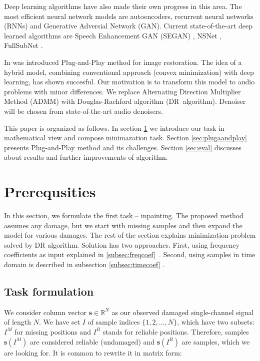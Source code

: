 \documentclass[conference]{IEEEtran}
\begin{document}
Deep learning algorithms have also made their own progress in this area.
The most efficient neural network models are autoencoders,
recurrent neural networks (RNNs) and
Generative Adversial Network (GAN).
Current state-of-the-art deep learned algorithms are Speech Enhancement GAN (SEGAN) \cite{Pascual2017}, NSNet \cite{Xia2020}, FullSubNet \cite{Hao2021}. 

In \cite{Chan2016} was introduced Plug-and-Play method for image restoration.
The idea of a hybrid model,
combining conventional approach (convex minimization) with deep learning,
has shown succesful.
Our motivation is to transform this model to audio problems with minor differences.
We replace Alternating Direction Multiplier Method (ADMM) with Douglas-Rachford algorithm (DR~algorithm).
Denoiser will be chosen from state-of-the-art audio denoisers. 

This paper is organized as follows. In section \ref{sec:prereq} we introduce our task in mathematical view and compose minimazation task.
Section \ref{sec:plugaandplay}  presents Plug-and-Play method and its challenges.
Section \ref{sec:eval} discusses about results and further improvements of algorithm.

\section{Prerequsities}\label{sec:prereq} 

In this section, we formulate the first task -- inpainting.
The proposed method \cite{Chan2016} assumes any damage,
but we start with missing samples and then expand the model for various damages.
The rest of the section explains minimization problem solved by DR algorithm.
Solution has two approaches.
First, using frequency coefficients as input explained in \ref{subsec:freqcoef}~\cite{Mokry2020}.
Second, using samples in time domain is described in subsection \ref{subsec:timecoef} \cite{Mokry2021}.


\subsection{Task formulation}

We consider column vector $ \mathbf{s} \in \mathbb{R}^{N} $ as our observed damaged single-channel signal of length $ N $.
We have set $ I $ of sample indices $ \{1,2,\dots,N\} $, which have two subsets: $ I^M $ for missing positions and $ I^R $ stands for reliable positions.
Therefore, samples $ \mathbf{s}(I^M) $ are considered reliable (undamaged) and $ \mathbf{s}(I^R) $ are samples, which we are looking for.
It is common to rewrite it in matrix form:
\end{document}
